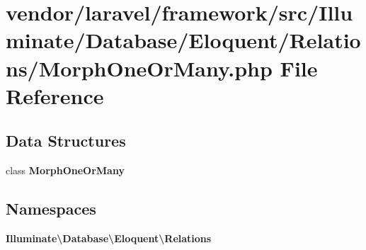 \section{vendor/laravel/framework/src/\+Illuminate/\+Database/\+Eloquent/\+Relations/\+Morph\+One\+Or\+Many.php File Reference}
\label{_morph_one_or_many_8php}
\subsection*{Data Structures}
\begin{DoxyCompactItemize}
\item 
class {\bf Morph\+One\+Or\+Many}
\end{DoxyCompactItemize}
\subsection*{Namespaces}
\begin{DoxyCompactItemize}
\item 
 {\bf Illuminate\textbackslash{}\+Database\textbackslash{}\+Eloquent\textbackslash{}\+Relations}
\end{DoxyCompactItemize}
